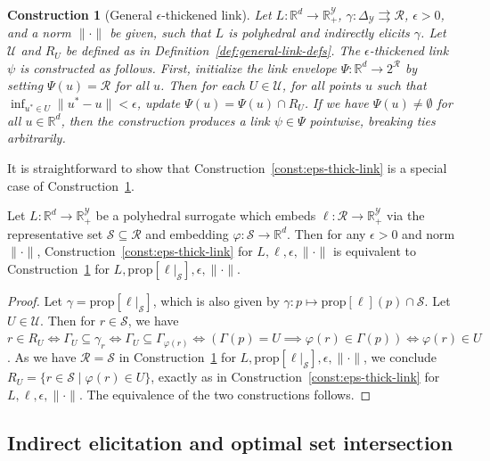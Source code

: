 \documentclass[twoside,11pt]{article}
\newcommand{\reals}{\mathbb{R}}
\newcommand{\prop}[1]{\mathrm{prop}[#1]}
\newcommand{\simplex}{\Delta_\Y}
\newcommand{\R}{\mathcal{R}}
\newcommand{\Sc}{\mathcal{S}}
\newcommand{\U}{\mathcal{U}}
\newcommand{\Y}{\mathcal{Y}}
\newcommand{\toto}{\rightrightarrows}
\newtheorem{construction}{Construction}
\begin{document}
\begin{construction}[General $\epsilon$-thickened link] \label{const:general-eps-thick-link}
  Let $L:\reals^d\to\reals^\Y_+$, $\gamma:\simplex\toto\R$, $\epsilon > 0$, and a norm $\|\cdot\|$ be given, such that $L$ is polyhedral and indirectly elicits $\gamma$.
  Let $\U$ and $R_U$ be defined as in Definition~\ref{def:general-link-defs}.
  The \emph{$\epsilon$-thickened link} $\psi$ is constructed as follows.
  First, initialize the \emph{link envelope} $\Psi: \reals^d \to 2^{\R}$ by setting $\Psi(u) = \R$ for all $u$.
  Then for each $U \in \U$, for all points $u$ such that $\inf_{u^* \in U} \|u^*-u\| < \epsilon$, update $\Psi(u) = \Psi(u) \cap R_U$.
  If we have $\Psi(u)\neq\emptyset$ for all $u\in\reals^d$, then the construction \emph{produces a link} $\psi \in \Psi$ pointwise, breaking ties arbitrarily.
\end{construction}

It is straightforward to show that Construction~\ref{const:eps-thick-link} is a special case of Construction~\ref{const:general-eps-thick-link}.

\begin{lemma}\label{lem:general-construction-special-case}
  Let $L:\reals^d\to\reals^\Y_+$ be a polyhedral surrogate which embeds $\ell:\R\to\reals^\Y_+$ via the representative set $\Sc\subseteq\R$ and embedding $\varphi:\Sc\to\reals^d$.
  Then for any $\epsilon>0$ and norm $\|\cdot\|$,
  Construction~\ref{const:eps-thick-link} for $L,\ell,\epsilon,\|\cdot\|$ is equivalent to
  Construction~\ref{const:general-eps-thick-link} for $L,\prop{\ell|_\Sc},\epsilon,\|\cdot\|$.
\end{lemma}
\begin{proof}
  Let $\gamma = \prop{\ell|_\Sc}$, which is also given by $\gamma: p \mapsto \prop{\ell}(p) \cap \Sc$.
  Let $U\in\U$.
  Then for $r\in\Sc$, we have $r \in R_U \iff \Gamma_U \subseteq \gamma_r \iff \Gamma_U \subseteq \Gamma_{\varphi(r)} \iff (\Gamma(p) = U \implies \varphi(r) \in \Gamma(p)) \iff \varphi(r) \in U$.
  As we have $\R = \Sc$ in Construction~\ref{const:general-eps-thick-link} for $L,\prop{\ell|_\Sc},\epsilon,\|\cdot\|$, we conclude
  $R_U = \{r\in\Sc \mid \varphi(r) \in U\}$, exactly as in Construction~\ref{const:eps-thick-link} for $L,\ell,\epsilon,\|\cdot\|$.
  The equivalence of the two constructions follows.
\end{proof}

\subsection{Indirect elicitation and optimal set intersection}
\end{document}
